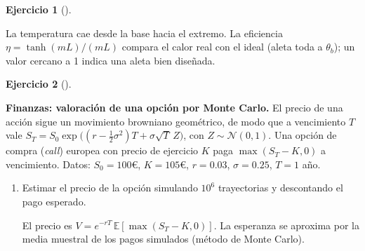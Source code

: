 \documentclass[
  spanish,
  a4paper,
]{scrreport}
\theoremstyle{definition}
\newtheorem{exercise}{Ejercicio}[chapter]
\theoremstyle{remark}
\begin{document}
\begin{exercise}[]
\begin{enumerate}
\begin{tcolorbox}
  La temperatura cae desde la base hacia el extremo. La eficiencia
  \(\eta = \tanh(mL)/(mL)\) compara el calor real con el ideal (aleta
  toda a \(\theta_b\)); un valor cercano a 1 indica una aleta bien
  diseñada.

  \end{tcolorbox}
\end{enumerate}

\end{exercise}

\begin{exercise}[]\protect\hypertarget{exr-opciones-montecarlo}{}\label{exr-opciones-montecarlo}

\textbf{Finanzas: valoración de una opción por Monte Carlo.} El precio
de una acción sigue un movimiento browniano geométrico, de modo que a
vencimiento \(T\) vale
\(S_T = S_0\exp\!\big((r - \tfrac{1}{2}\sigma^2)T + \sigma\sqrt{T}\,Z\big)\),
con \(Z\sim\mathcal N(0,1)\). Una opción de compra (\emph{call}) europea
con precio de ejercicio \(K\) paga \(\max(S_T - K, 0)\) a vencimiento.
Datos: \(S_0 = 100\)€, \(K = 105\)€, \(r = 0.03\), \(\sigma = 0.25\),
\(T = 1\) año.

\begin{enumerate}
\def\labelenumi{\alph{enumi}.}
\item
  Estimar el precio de la opción simulando \(10^6\) trayectorias y
  descontando el pago esperado.

  \begin{tcolorbox}[enhanced jigsaw, arc=.35mm, bottomrule=.15mm, bottomtitle=1mm, breakable, colback=white, colbacktitle=quarto-callout-note-color!10!white, colframe=quarto-callout-note-color-frame, coltitle=black, left=2mm, leftrule=.75mm, opacityback=0, opacitybacktitle=0.6, rightrule=.15mm, title=\textcolor{quarto-callout-note-color}{\faInfo}\hspace{0.5em}{Ayuda}, titlerule=0mm, toprule=.15mm, toptitle=1mm]

  El precio es \(V = e^{-rT}\,\mathbb E[\max(S_T-K,0)]\). La esperanza
  se aproxima por la media muestral de los pagos simulados (método de
  Monte Carlo).

  \end{tcolorbox}

  \begin{tcolorbox}[enhanced jigsaw, arc=.35mm, bottomrule=.15mm, bottomtitle=1mm, breakable, colback=white, colbacktitle=quarto-callout-tip-color!10!white, colframe=quarto-callout-tip-color-frame, coltitle=black, left=2mm, leftrule=.75mm, opacityback=0, opacitybacktitle=0.6, rightrule=.15mm, title=\textcolor{quarto-callout-tip-color}{\faLightbulb}\hspace{0.5em}{Solución}, titlerule=0mm, toprule=.15mm, toptitle=1mm]


\end{tcolorbox}
\end{enumerate}
\end{exercise}
\end{document}
